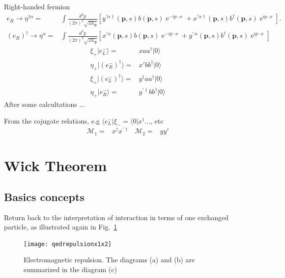 Right-handed fermion 
\begin{align}
e_R\to  \eta^{\dagger\dot{\alpha}}=&\int \frac{d^3 p}{(2\pi)^3\sqrt{2E_{\mathbf{p}}}} \left[y^{\prime\dot{\alpha}\dagger}(\mathbf{p},s)b(\mathbf{p},s)\operatorname{e}^{-i p\cdot x}+ x^{\prime\dot{\alpha}\dagger}(\mathbf{p},s)b^{\dagger}(\mathbf{p},s)\operatorname{e}^{i p\cdot x} \right] .
 \nonumber\\
\left( e_R \right)^{\dagger}\to  \eta^{\alpha}=&\int \frac{d^3 p}{(2\pi)^3\sqrt{2E_{\mathbf{p}}}} \left[ x^{\prime\alpha}(\mathbf{p},s)b(\mathbf{p},s)\operatorname{e}^{-i p\cdot x}+y^{\prime\,\alpha}(\mathbf{p},s)b^{\dagger}(\mathbf{p},s)\operatorname{e}^{i p\cdot x} \right]
\end{align}
\begin{align}
 \xi_{+} | e^{-}_{L}\rangle =& x a a^{\dagger} |0\rangle \nonumber\\
 \eta_{+} | \left( e^{-}_{R} \right)^{\dagger}\rangle =& x' b b^{\dagger} |0\rangle \nonumber\\
 \xi_{+} |  \left( e^{-}_{L} \right)^{\dagger} \rangle =& y^{\dagger} a a^{\dagger} |0\rangle \nonumber\\
 \eta_{+} | e^{-}_{R} \rangle =& y^{\prime \dagger} b b^{\dagger} |0\rangle
\end{align}
After some calcultations ...

From the cojugate relations, e.g $\langle e_L^- |\xi_-=\langle 0|x^{\dagger}...$, etc
\begin{align}
  \mathcal{M}_1 =& x^{\dagger} x^{\prime \dagger} &\mathcal{M}_2=& y y'
\end{align}
\section{Wick Theorem}
\label{sec:wick-theorem}

\subsection{Basics concepts}
Return back to  the interpretation of interaction in terms of one exchanged particle, as illustrated again in Fig.~\ref{fig:qedrepulsionx1x2}
\begin{figure}
  \centering
  \texttt{[image: qedrepulsionx1x2]}
  \caption{Electromagnetic repulsion. The diagrams (a) and (b) are summarized in the diagram (c)}
  \label{fig:qedrepulsionx1x2}
\end{figure}


